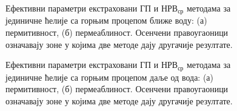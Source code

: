 \begin{figure}[!t]
\centering
{}\hfill
{}
\caption{Ефективни параметри екстраховани ГП и $НРВ_{ср}$ методама за јединичне ћелије са горњим процепом ближе воду: (а) пермитивност, (б) пермеаблиност. Осенчени правоугаоници означавају зоне у којима две методе дају другачије резултате.}
\label{fig14_2}
\end{figure}
\begin{figure}[!t]
\centering
{}\hfill
{}
\caption{Ефективни параметри екстраховани ГП и $НРВ_{ср}$ методама за јединичне ћелије са горњим процепом даље од вода: (а) пермитивност, (б) пермеаблиност. Осенчени правоугаоници означавају зоне у којима две методе дају другачије резултате.}
\label{fig14_3}
\end{figure}

